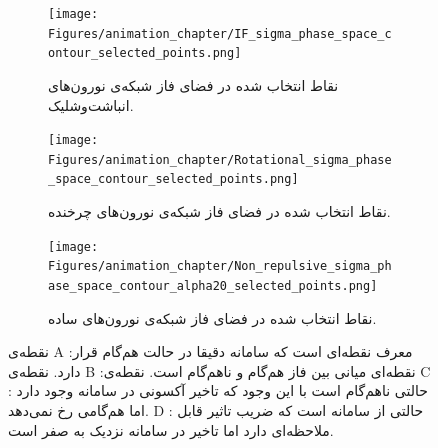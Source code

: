 \begin{figure}[!h]
	\begin{subfigure}{0.5\textwidth}
	\texttt{[image: Figures/animation\_chapter/IF\_sigma\_phase\_space\_contour\_selected\_points.png]}
	\caption{
		نقاط انتخاب شده در فضای فاز شبکه‌ی نورون‌های انباشت‌وشلیک.
	}
	\label{fig:IF_abc}
	\end{subfigure}
	\hfill
	\begin{subfigure}{0.5\textwidth}
		\texttt{[image: Figures/animation\_chapter/Rotational\_sigma\_phase\_space\_contour\_selected\_points.png]}
		\caption{
		نقاط انتخاب شده در فضای فاز شبکه‌ی نورون‌های چرخنده.
	}
		\label{fig:Rotational_abc}
	\end{subfigure}
	\hfill
	\begin{subfigure}{0.5\textwidth}
		\texttt{[image: Figures/animation\_chapter/Non\_repulsive\_sigma\_phase\_space\_contour\_alpha20\_selected\_points.png]}
		\caption{
		نقاط انتخاب شده در فضای فاز شبکه‌ی نورون‌های ساده.
		}
		\label{fig:Non_repulsive_abc}
	\end{subfigure}
	\hfill
	\caption{
	نقطه‌ی 
A
:معرف نقطه‌ای است که سامانه دقیقا در حالت هم‌گام قرار دارد.
نقطه‌ی
B
:نقطه‌ای میانی بین فاز هم‌گام و ناهم‌گام است.
نقطه‌ی
C
: حالتی ناهم‌گام است با این وجود که تاخیر آکسونی در سامانه وجود دارد اما هم‌گامی رخ نمی‌دهد.
D
: حالتی از سامانه است که ضریب تاثیر قابل ملاحظه‌ای دارد اما تاخیر در سامانه نزدیک به صفر است.}
	\label{fig:abc_points_neuron_models}
\end{figure}

\newpage

